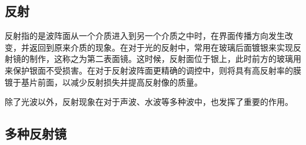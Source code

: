 \begin{issues}
\issueDraft
\issueMissDepend
\end{issues}

\subsection{反射}
反射指的是波阵面从一个介质进入到另一个介质之中时，在界面传播方向发生改变，并返回到原来介质的现象。在对于光的反射中，常用在玻璃后面镀银来实现反射镜的制作，这称之为第二表面镜。这时候，反射面位于银上，此时前方的玻璃用来保护银面不受损害。在对于反射波阵面更精确的调控中，则将具有高反射率的膜镀于基片前面，以减少反射损失并提高反射像的质量。

除了光波以外，反射现象在对于声波、水波等多种波中，也发挥了重要的作用。
\subsection{多种反射镜}